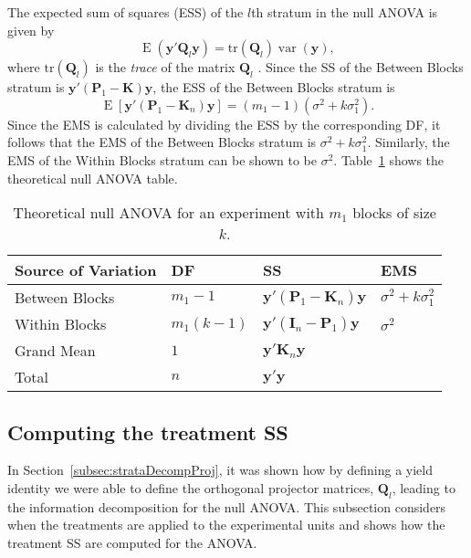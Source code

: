 \documentclass[article]{jss}
\newcommand{\mP}{\mathbf{P}}
\newcommand{\I}{\mathbf{I}}
\newcommand{\K}{\mathbf{K}}
\newcommand{\Q}{\mathbf{Q}}
\begin{document}
The expected sum of squares (ESS) of the $l$th stratum in the null ANOVA is given by
\begin{equation}
\label{eq:ESSQuad}
\operatorname{E}(\bm{y}'\Q_l\bm{y})= \mathrm{tr}(\Q_l)\operatorname{var}(\bm{y}),
\end{equation}
where $\mathrm{tr}(\Q_l)$ is the \emph{trace} of the matrix $\Q_l$ \citep{Searle1982}. Since the SS of the Between Blocks stratum is $\bm{y}'(\mP_{1}-\K)\bm{y}$, the ESS of the Between Blocks stratum is
\begin{equation} \label{eq:computRBD}
\operatorname{E}[\bm{y}'(\mP_{1}-\K_n)\bm{y}] =  (m_1 - 1)(\sigma^2 +k\sigma^2_1).
\end{equation}
Since the EMS is calculated by dividing the ESS by the corresponding DF, it follows that the EMS of the Between Blocks stratum is $\sigma^2 +k\sigma^2_1$. Similarly, the EMS of the Within Blocks stratum can be shown to be $\sigma^2$. Table~\ref{tab:infoDecomp} shows the theoretical null ANOVA table.

\begin{table}[ht]
\centering
\caption{Theoretical null ANOVA	for an experiment with $m_1$ blocks of size $k$.}
\begin{tabular}[t]{llll}
\toprule
 \multicolumn{1}{l}{\bf Source of Variation}&  \multicolumn{1}{l}{\bf DF} & \multicolumn{1}{l}{\bf SS} & \multicolumn{1}{l}{\bf EMS}\\
\midrule
Between Blocks 	 &$m_1-1$ & $\bm{y}'(\mP_{1}-\K_n)\bm{y}$	& $\sigma^2 + k\sigma_{1}^2$\\
Within Blocks 	&$m_1(k - 1)$ & $\bm{y}'(\I_n - \mP_{1})\bm{y}$  & $\sigma^2$\\
\hline
Grand Mean	& $1$ & $\bm{y}'\K_n\bm{y}$ \\
\midrule
Total 	& $n$ & $\bm{y}'\bm{y}$ \\
\bottomrule
\end{tabular}
\label{tab:infoDecomp}
\end{table}

\subsection{Computing the treatment SS}
\label{subsec:estTrt}
In Section~\ref{subsec:strataDecompProj}, it was shown how by defining a yield identity we were able to define the orthogonal projector matrices, $\Q_{l}$, leading to the information decomposition for the null ANOVA. This subsection considers when the treatments are applied to the experimental units and shows how the treatment SS are computed for the ANOVA. 
\end{document}
